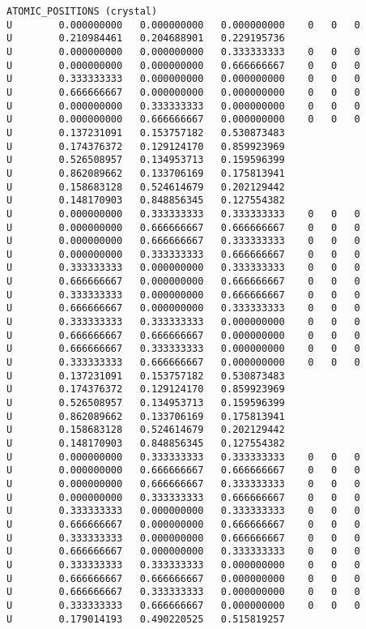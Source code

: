 \begin{lstlisting}
ATOMIC_POSITIONS (crystal)
U        0.000000000   0.000000000   0.000000000    0   0   0
U        0.210984461   0.204688901   0.229195736
U        0.000000000   0.000000000   0.333333333    0   0   0
U        0.000000000   0.000000000   0.666666667    0   0   0
U        0.333333333   0.000000000   0.000000000    0   0   0
U        0.666666667   0.000000000   0.000000000    0   0   0
U        0.000000000   0.333333333   0.000000000    0   0   0
U        0.000000000   0.666666667   0.000000000    0   0   0
U        0.137231091   0.153757182   0.530873483
U        0.174376372   0.129124170   0.859923969
U        0.526508957   0.134953713   0.159596399
U        0.862089662   0.133706169   0.175813941
U        0.158683128   0.524614679   0.202129442
U        0.148170903   0.848856345   0.127554382
U        0.000000000   0.333333333   0.333333333    0   0   0
U        0.000000000   0.666666667   0.666666667    0   0   0
U        0.000000000   0.666666667   0.333333333    0   0   0
U        0.000000000   0.333333333   0.666666667    0   0   0
U        0.333333333   0.000000000   0.333333333    0   0   0
U        0.666666667   0.000000000   0.666666667    0   0   0
U        0.333333333   0.000000000   0.666666667    0   0   0
U        0.666666667   0.000000000   0.333333333    0   0   0
U        0.333333333   0.333333333   0.000000000    0   0   0
U        0.666666667   0.666666667   0.000000000    0   0   0
U        0.666666667   0.333333333   0.000000000    0   0   0
U        0.333333333   0.666666667   0.000000000    0   0   0
U        0.137231091   0.153757182   0.530873483
U        0.174376372   0.129124170   0.859923969
U        0.526508957   0.134953713   0.159596399
U        0.862089662   0.133706169   0.175813941
U        0.158683128   0.524614679   0.202129442
U        0.148170903   0.848856345   0.127554382
U        0.000000000   0.333333333   0.333333333    0   0   0
U        0.000000000   0.666666667   0.666666667    0   0   0
U        0.000000000   0.666666667   0.333333333    0   0   0
U        0.000000000   0.333333333   0.666666667    0   0   0
U        0.333333333   0.000000000   0.333333333    0   0   0
U        0.666666667   0.000000000   0.666666667    0   0   0
U        0.333333333   0.000000000   0.666666667    0   0   0
U        0.666666667   0.000000000   0.333333333    0   0   0
U        0.333333333   0.333333333   0.000000000    0   0   0
U        0.666666667   0.666666667   0.000000000    0   0   0
U        0.666666667   0.333333333   0.000000000    0   0   0
U        0.333333333   0.666666667   0.000000000    0   0   0
U        0.179014193   0.490220525   0.515819257

\end{lstlisting}
